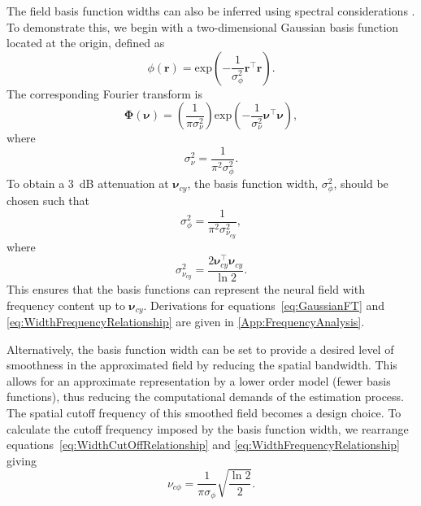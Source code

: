 \documentclass[review,authoryear,3p]{elsarticle}
\begin{document}
The field basis function widths can also be inferred using spectral considerations \citep{Sanner1992,Scerri2009}. To demonstrate this, we begin with a two-dimensional Gaussian basis function located at the origin, defined as
\begin{equation}\label{eq:BasisFunctionAtOrigin}
 \phi(\mathbf r)=\mathrm{exp}\left({-\frac{1}{\sigma_{\phi}^2} \mathbf r^\top\mathbf r}\right).
\end{equation}
The corresponding Fourier transform is
\begin{equation}\label{eq:GaussianFT}
\boldsymbol\Phi(\boldsymbol \nu)=\left(\frac{1}{\pi\sigma_{\nu}^2}\right)\mathrm{exp}\left(-\frac{1}{\sigma_{\nu}^2}\boldsymbol\nu^\top \boldsymbol\nu\right),
\end{equation}
where 
\begin{equation}\label{eq:GaussianFTWidth}
	\sigma^2_{\nu} = \frac{1}{\pi^2\sigma_{\phi}^2}. 
\end{equation}
To obtain a 3~dB attenuation at $\boldsymbol\nu_{cy}$, the basis function width, $\sigma^2_{\phi}$, should be chosen such that
\begin{equation}\label{eq:WidthCutOffRelationship}
 \sigma^2_{\phi}= \frac{1}{\pi^2\sigma_{\nu_{cy}}^2},
\end{equation}
where
\begin{equation}\label{eq:WidthFrequencyRelationship}
 \sigma^2_{\nu_{cy}}= \frac{2\boldsymbol\nu_{cy}^\top \boldsymbol\nu_{cy}}{\ln2}.
\end{equation}
This ensures that the basis functions can represent the neural field with frequency content up to $\boldsymbol\nu_{cy}$. Derivations for equations~\ref{eq:GaussianFT} and \ref{eq:WidthFrequencyRelationship} are given in \ref{App:FrequencyAnalysis}.

Alternatively, the basis function width can be set to provide a desired level of smoothness in the approximated field by reducing the spatial bandwidth. This allows for an approximate representation by a lower order model (fewer basis functions), thus reducing the computational demands of the estimation process. The spatial cutoff frequency of this smoothed field becomes a design choice. To calculate the cutoff frequency imposed by the basis function width, we rearrange equations~\ref{eq:WidthCutOffRelationship} and \ref{eq:WidthFrequencyRelationship} giving
\begin{equation}\label{eq:CutoffFromBasisFuncWidth}
	\nu_{c\phi}=\frac{1}{\pi\sigma_{\phi}}\sqrt{\frac{\ln2}{2}}.
\end{equation} 
\end{document}

